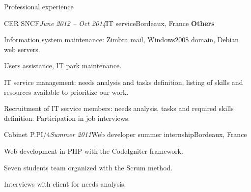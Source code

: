\begin{rSection}{Professional experience}
\begin{rSubsection}{CER SNCF}{\em June 2012 -- Oct 2014}{IT service}{Bordeaux, France}
    \textbf{Others}
      \item Information system maintenance: Zimbra mail, Windows2008 domain, Debian web servers.
      \item Users assistance, IT park maintenance.
      \item IT service management: needs analysis and tasks definition, listing of skills and resources available to prioritize our work.
      \item Recruitment of IT service members: needs analysis, tasks and required skills definition. Participation in job interviews.

  \end{rSubsection}


  \begin{rSubsection}{Cabinet P.PI/4}{\em Summer 2011}{Web developer summer internship}{Bordeaux, France}
    \item Web development in PHP with the CodeIgniter framework.
    \item Seven students team organized with the Scrum method.
    \item Interviews with client for needs analysis.
  \end{rSubsection}

\end{rSection}
